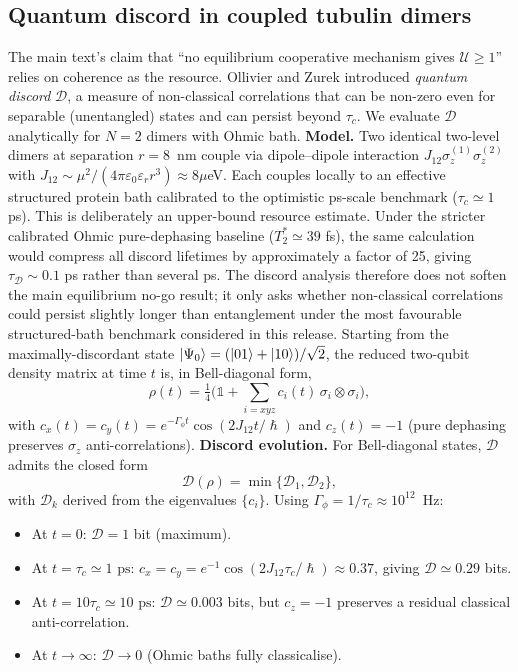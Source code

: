 \documentclass[twocolumn,10pt]{article}
\renewcommand{\hbar}{\hslash}
\newcommand{\ps}{\text{~ps}}
\begin{document}
\subsection{Quantum discord in coupled tubulin dimers}
\label{sec:discord}
The main text's claim that ``no equilibrium cooperative mechanism gives
$\mathcal{U}\ge 1$'' relies on coherence as the resource. Ollivier and
Zurek \cite{Ollivier2001} introduced \emph{quantum discord} $\mathcal{D}$,
a measure of non-classical correlations that can be non-zero even for
separable (unentangled) states and can persist beyond $\tau_c$. We
evaluate $\mathcal{D}$ analytically for $N=2$ dimers with Ohmic bath.
\textbf{Model.} Two identical two-level dimers at separation $r=8$~nm
couple via dipole--dipole interaction $J_{12}\sigma_z^{(1)}\sigma_z^{(2)}$
with $J_{12}\sim \mu^2/(4\pi\varepsilon_0\varepsilon_r r^3)\approx 8\mu$eV.
Each couples locally to an effective structured protein bath calibrated to
the optimistic ps-scale benchmark ($\tau_c\simeq1$ ps). This is deliberately
an upper-bound resource estimate. Under the stricter calibrated Ohmic
pure-dephasing baseline ($T_2^*\simeq39$ fs), the same calculation would
compress all discord lifetimes by approximately a factor of 25, giving
$\tau_{\mathcal{D}}\sim0.1$ ps rather than several ps. The discord analysis
therefore does not soften the main equilibrium no-go result; it only asks
whether non-classical correlations could persist slightly longer than
entanglement under the most favourable structured-bath benchmark considered
in this release. Starting from the maximally-discordant
state $\ket{\Psi_0}=(\ket{01}+\ket{10})/\sqrt{2}$, the reduced
two-qubit density matrix at time $t$ is, in Bell-diagonal form,
\begin{equation}
\rho(t) = \tfrac{1}{4}\bigl(\mathbb{1}+\sum_{i=xyz}
c_i(t)\,\sigma_i\otimes\sigma_i\bigr),
\end{equation}
with $c_x(t)=c_y(t)=e^{-\Gamma_\phi t}\cos(2J_{12}t/\hbar)$ and
$c_z(t)=-1$ (pure dephasing preserves $\sigma_z$ anti-correlations).
\textbf{Discord evolution.} For Bell-diagonal states,
$\mathcal{D}$ admits the closed form \cite{Luo2008}
\begin{equation}
\mathcal{D}(\rho)=\min\bigl\{\mathcal{D}_1,\mathcal{D}_2\bigr\},
\end{equation}
with $\mathcal{D}_k$ derived from the eigenvalues $\{c_i\}$. Using
$\Gamma_\phi=1/\tau_c\approx 10^{12}$~Hz:
\begin{itemize}
\item At $t=0$: $\mathcal{D}=1$ bit (maximum).
\item At $t=\tau_c\simeq 1\ps$: $c_x=c_y=e^{-1}\cos(2J_{12}\tau_c/\hbar)
\approx 0.37$, giving $\mathcal{D}\simeq 0.29$ bits.
\item At $t=10\tau_c\simeq 10\ps$: $\mathcal{D}\simeq 0.003$ bits, but
$c_z=-1$ preserves a residual classical anti-correlation.
\item At $t\to\infty$: $\mathcal{D}\to 0$ (Ohmic baths fully classicalise).
\end{itemize}
\end{document}
